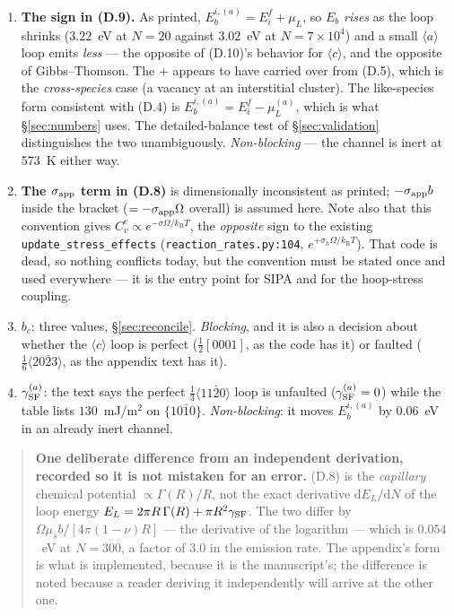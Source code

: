 \documentclass[11pt]{article}
\newcommand{\aloop}{\ensuremath{\langle a\rangle}}
\newcommand{\cloop}{\ensuremath{\langle c\rangle}}
\newcommand{\fbk}{\discretionary{}{}{}}   %
\newcommand{\file}[1]{\texttt{\small #1}}
\newcommand{\kB}{k_{\mathrm B}}
\newcommand{\GSF}{\gamma_{\rm SF}}
\begin{document}
\begin{enumerate}
\item \textbf{The sign in (D.9).}  As printed, $E_b^{i,(a)}=E_i^{f}+\mu_L$,
  so $E_b$ \emph{rises} as the loop shrinks ($3.22$~eV at $N=20$ against
  $3.02$~eV at $N=7\times10^{4}$) and a small \aloop{} loop emits
  \emph{less} --- the opposite of (D.10)'s behavior for \cloop{}, and the
  opposite of Gibbs--Thomson.  The $+$ appears to have carried over from
  (D.5), which is the \emph{cross-species} case (a vacancy at an interstitial
  cluster).  The like-species form consistent with (D.4) is
  $E_b^{i,(a)}=E_i^{f}-\mu_L^{(a)}$, which is what \S\ref{sec:numbers} uses.
  The detailed-balance test of \S\ref{sec:validation} distinguishes the two
  unambiguously.  \emph{Non-blocking} --- the channel is inert at 573~K
  either way.
\item \textbf{The $\sigma_{\rm app}$ term in (D.8)} is dimensionally
  inconsistent as printed; $-\sigma_{\rm app}b$ inside the bracket
  ($=-\sigma_{\rm app}\Omega$ overall) is assumed here.  Note also that this
  convention gives $C_v^{e}\propto e^{-\sigma\Omega/\kB T}$, the
  \emph{opposite} sign to the existing \verb|update_stress_effects|
  (\file{reaction\_\fbk rates.\fbk py:104}, $e^{+\sigma_h\Omega/\kB T}$).
  That code is dead, so nothing conflicts today, but the convention must be
  stated once and used everywhere --- it is the entry point for SIPA and for
  the hoop-stress coupling.
\item \textbf{$b_c$}: three values, \S\ref{sec:reconcile}.  \emph{Blocking},
  and it is also a decision about whether the \cloop{} loop is perfect
  ($\tfrac12[0001]$, as the code has it) or faulted
  ($\tfrac16\langle20\bar23\rangle$, as the appendix text has it).
\item \textbf{$\GSF^{(a)}$}: the text says the perfect
  $\tfrac13\langle11\bar20\rangle$ loop is unfaulted ($\GSF^{(a)}=0$) while
  the table lists $130$~mJ/m$^2$ on $\{10\bar10\}$.  \emph{Non-blocking}: it
  moves $E_b^{i,(a)}$ by $0.06$~eV in an already inert channel.
\end{enumerate}

\begin{quote}\small
\textbf{One deliberate difference from an independent derivation, recorded so
it is not mistaken for an error.}  (D.8) is the \emph{capillary} chemical
potential $\propto\Gamma(R)/R$, not the exact derivative
$\mathrm dE_L/\mathrm dN$ of the loop energy
$E_L=2\pi R\,\Gamma(R)+\pi R^{2}\GSF$.  The two differ by
$\Omega\mu_s b/[4\pi(1-\nu)R]$ --- the derivative of the logarithm --- which
is $0.054$~eV at $N=300$, a factor of $3.0$ in the emission rate.  The
appendix's form is what is implemented, because it is the manuscript's; the
difference is noted because a reader deriving it independently will arrive at
the other one.
\end{quote}
\end{document}
